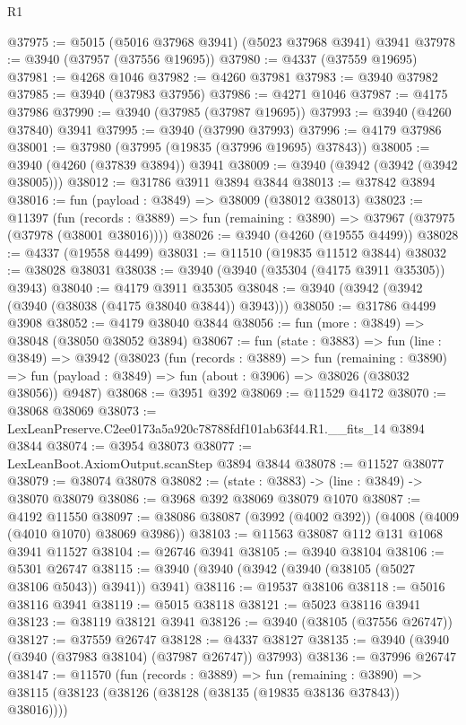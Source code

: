 \begin{lexlean}{R1}
\begin{coremodule}
@37975 := @5015 (@5016 @37968 @3941) (@5023 @37968 @3941) @3941
@37978 := @3940 (@37957 (@37556 @19695))
@37980 := @4337 (@37559 @19695)
@37981 := @4268 @1046
@37982 := @4260 @37981
@37983 := @3940 @37982
@37985 := @3940 (@37983 @37956)
@37986 := @4271 @1046
@37987 := @4175 @37986
@37990 := @3940 (@37985 (@37987 @19695))
@37993 := @3940 (@4260 @37840) @3941
@37995 := @3940 (@37990 @37993)
@37996 := @4179 @37986
@38001 := @37980 (@37995 (@19835 (@37996 @19695) @37843))
@38005 := @3940 (@4260 (@37839 @3894)) @3941
@38009 := @3940 (@3942 (@3942 (@3942 @38005)))
@38012 := @31786 @3911 @3894 @3844
@38013 := @37842 @3894
@38016 := fun (payload : @3849) => @38009 (@38012 @38013)
@38023 := @11397
    (fun (records : @3889) => fun (remaining : @3890) => @37967 (@37975 (@37978 (@38001 @38016))))
@38026 := @3940 (@4260 (@19555 @4499))
@38028 := @4337 (@19558 @4499)
@38031 := @11510 (@19835 @11512 @3844)
@38032 := @38028 @38031
@38038 := @3940 (@3940 (@35304 (@4175 @3911 @35305)) @3943)
@38040 := @4179 @3911 @35305
@38048 := @3940 (@3942 (@3942 (@3940 (@38038 (@4175 @38040 @3844)) @3943)))
@38050 := @31786 @4499 @3908
@38052 := @4179 @38040 @3844
@38056 := fun (more : @3849) => @38048 (@38050 @38052 @3894)
@38067 := fun (state : @3883) =>
  fun (line : @3849) =>
  @3942
    (@38023
      (fun (records : @3889) =>
      fun (remaining : @3890) =>
      fun (payload : @3849) => fun (about : @3906) => @38026 (@38032 @38056))
      @9487)
@38068 := @3951 @392
@38069 := @11529 @4172
@38070 := @38068 @38069
@38073 := LexLeanPreserve.C2ee0173a5a920c78788fdf101ab63f44.R1.__fits_14 @3894 @3844
@38074 := @3954 @38073
@38077 := LexLeanBoot.AxiomOutput.scanStep @3894 @3844
@38078 := @11527 @38077
@38079 := @38074 @38078
@38082 := (state : @3883) -> (line : @3849) -> @38070 @38079
@38086 := @3968 @392 @38069 @38079 @1070
@38087 := @4192 @11550
@38097 := @38086 @38087 (@3992 (@4002 @392)) (@4008 (@4009 (@4010 @1070) @38069 @3986))
@38103 := @11563 @38087 @112 @131 @1068 @3941 @11527
@38104 := @26746 @3941
@38105 := @3940 @38104
@38106 := @5301 @26747
@38115 := @3940 (@3940 (@3942 (@3940 (@38105 (@5027 @38106 @5043)) @3941)) @3941)
@38116 := @19537 @38106
@38118 := @5016 @38116 @3941
@38119 := @5015 @38118
@38121 := @5023 @38116 @3941
@38123 := @38119 @38121 @3941
@38126 := @3940 (@38105 (@37556 @26747))
@38127 := @37559 @26747
@38128 := @4337 @38127
@38135 := @3940 (@3940 (@3940 (@37983 @38104) (@37987 @26747)) @37993)
@38136 := @37996 @26747
@38147 := @11570
    (fun (records : @3889) =>
    fun (remaining : @3890) =>
    @38115 (@38123 (@38126 (@38128 (@38135 (@19835 @38136 @37843)) @38016))))

\end{coremodule}
\end{lexlean}
